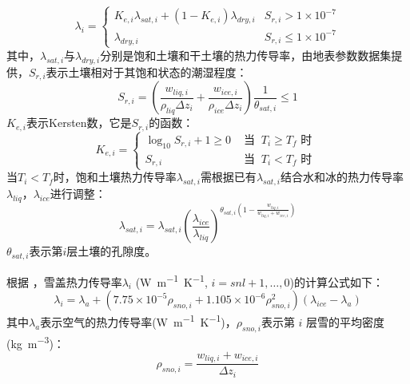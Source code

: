 \begin{equation}
\lambda_{i}=\left\{\begin{array}{ll}K_{e, i} \lambda_{sat, i}+\left(1-K_{e, i}\right) \lambda_{d r y, i} & S_{r, i}>1 \times 10^{-7} \\ \lambda_{d r y, i} & S_{r, i} \leq 1 \times10^{-7}\end{array}\right.
\end{equation}
其中，$\lambda_{sat,i}$与$\lambda_{dry,i}$分别是饱和土壤和干土壤的热力传导率，由地表参数数据集提供，$S_{r,i}$表示土壤相对于其饱和状态的潮湿程度：
\begin{equation}
S_{r, i}=\left(\frac{w_{liq, i}}{\rho_{liq} \Delta z_{i}}+\frac{w_{ice, i}}{\rho_{ice} \Delta z_{i}}\right) \frac{1}{\theta_{sat, i}} \leq 1
\end{equation}
$K_{e,i}$表示Kersten数，它是$S_{r,i}$的函数：
\begin{equation}
K_{e, i}=\left\{\begin{array}{ll}\log _{10} S_{r, i}+1 \geq 0 & \text{ 当 }\ T_{i} \geq T_{f} \text{ 时 } \\ 
S_{r, i} & \text{ 当 }\ T_{i}<T_{f} \text{ 时 }\end{array}\right.
\end{equation}
当$T_i<T_f$时，饱和土壤热力传导率$\lambda_{sat,i}$需根据已有$\lambda_{sat,i}$结合水和冰的热力传导率$\lambda_{liq}$，$\lambda_{ice}$进行调整：
\begin{equation}
\lambda_{sat, i}=\lambda_{sat, i}\left(\frac{\lambda_{ice}}{\lambda_{liq}}\right)^{\theta_{sat, i}\left(1-\frac{w_{liq, i}}{w_{liq, i}+w_{ice, i}}\right)}
\end{equation}
$\theta_{sat, i}$表示第$ i $层土壤的孔隙度。


根据 \citet{jordan1991one}，雪盖热力传导率$\lambda_i$ (\unit{W.m^{-1}.K^{-1}}, $i=snl+1,\ldots,0$)的计算公式如下：
\begin{equation}
\lambda_{i}=\lambda_{a}+\left(7.75 \times 10^{-5} \rho_{sno, i}+1.105 \times 10^{-6} \rho_{sno, i}^{2}\right)\left(\lambda_{ice}-\lambda_{a}\right)
\end{equation}
其中$\lambda_a$表示空气的热力传导率(\unit{W.m^{-1}.K^{-1}})，$\rho_{sno,i}$表示第 $i$ 层雪的平均密度(\unit{kg.m^{-3}})：
\begin{equation}
\rho_{sno, i}=\frac{w_{liq, i}+w_{ice, i}}{\Delta z_{i}}
\end{equation}



